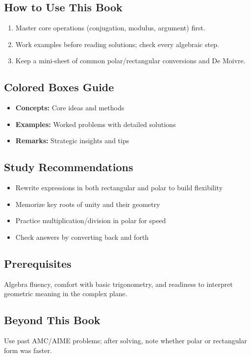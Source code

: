 \documentclass[12pt]{extarticle}
\begin{document}
\subsection*{How to Use This Book}
\begin{enumerate}
  \item Master core operations (conjugation, modulus, argument) first.
  \item Work examples before reading solutions; check every algebraic step.
  \item Keep a mini-sheet of common polar/rectangular conversions and De Moivre.
\end{enumerate}

\subsection*{Colored Boxes Guide}
\begin{itemize}
  \item \textcolor{orange!70!black}{\textbf{Concepts:}} Core ideas and methods
  \item \textcolor{blue!75!black}{\textbf{Examples:}} Worked problems with detailed solutions
  \item \textcolor{green!60!black}{\textbf{Remarks:}} Strategic insights and tips
\end{itemize}

\subsection*{Study Recommendations}
\begin{itemize}
  \item Rewrite expressions in both rectangular and polar to build flexibility
  \item Memorize key roots of unity and their geometry
  \item Practice multiplication/division in polar for speed
  \item Check answers by converting back and forth
\end{itemize}

\subsection*{Prerequisites}
Algebra fluency, comfort with basic trigonometry, and readiness to interpret geometric meaning in the complex plane.

\subsection*{Beyond This Book}
Use past AMC/AIME problems; after solving, note whether polar or rectangular form was faster.
\end{document}
